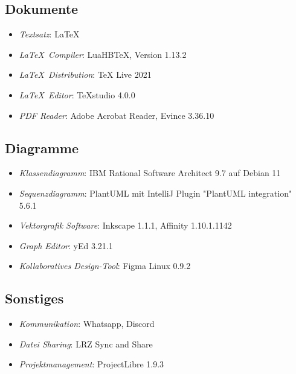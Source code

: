 \subsection{Dokumente}
\begin{itemize}
	\item \emph{Textsatz}: \LaTeX
	\item \emph{\LaTeX\ Compiler}: LuaHBTeX, Version 1.13.2
	\item \emph{\LaTeX\ Distribution}: TeX Live 2021
	\item \emph{\LaTeX\ Editor}: TeXstudio 4.0.0
	\item \emph{PDF Reader}: Adobe Acrobat Reader, Evince 3.36.10
\end{itemize}
\subsection{Diagramme}
\begin{itemize}
	\item \emph{Klassendiagramm}: IBM Rational Software Architect 9.7 auf Debian 11
	\item \emph{Sequenzdiagramm}: PlantUML mit IntelliJ Plugin "PlantUML integration" 5.6.1
	\item \emph{Vektorgrafik Software}: Inkscape 1.1.1, Affinity 1.10.1.1142
	\item \emph{Graph Editor}: yEd 3.21.1
	\item \emph{Kollaboratives Design-Tool}: Figma Linux 0.9.2
\end{itemize}
\subsection{Sonstiges}
\begin{itemize}
	\item \emph{Kommunikation}: Whatsapp, Discord
	\item \emph{Datei Sharing}: LRZ Sync and Share
	\item \emph{Projektmanagement}: ProjectLibre 1.9.3
\end{itemize}